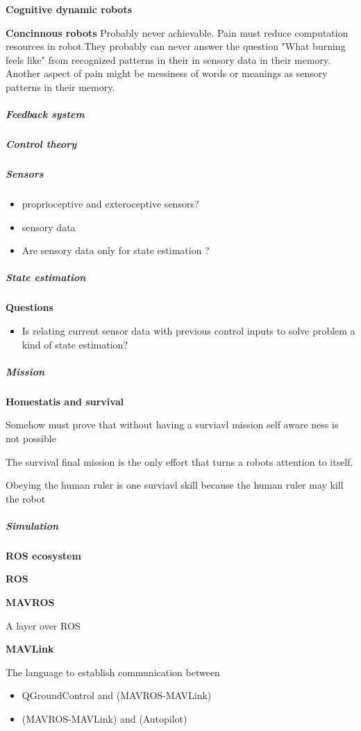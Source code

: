 \documentclass{book}
\providecommand{\ProjectDeepHeading}[2]{%
    \par\medskip\noindent\textbf{#2}\par\smallskip
}
\begin{document}
        \textbf{Cognitive dynamic robots}

        \textbf{Concinnous robots}
        Probably never achievable. Pain must reduce computation resources in robot.They probably can never answer the question "What burning feels like" from recognized patterns in their in sensory data in their memory. Another aspect of pain might be messiness of words or meanings as sensory patterns in their memory.

\subparagraph{Feedback system}

\subparagraph{Control theory}

\subparagraph{Sensors}
    \begin{itemize}
        \item proprioceptive and exteroceptive sensors?
        \item sensory data
        \item Are sensory data only for state estimation ?
    \end{itemize}

\subparagraph{State estimation}
    \ProjectDeepHeading{1}{Questions}
        \begin{itemize}
            \item Is relating current sensor data with previous control inputs to solve problem a kind of state estimation?
        \end{itemize}
    
\subparagraph{Mission}
    \ProjectDeepHeading{3}{Homestatis and survival}
        Somehow must prove that without having a surviavl mission self aware ness is not possible
        
        The survival final mission is the only effort that turns a robots attention to itself.
        
        Obeying the human ruler is one surviavl skill because the human ruler may kill the robot


        
\subparagraph{Simulation}
    \ProjectDeepHeading{1}{ROS ecosystem}
    
    
    \ProjectDeepHeading{1}{ROS}
    
    
    \ProjectDeepHeading{1}{MAVROS}
    A layer over ROS
    
    
    \ProjectDeepHeading{1}{MAVLink}
    The language to establish communication between
    \begin{itemize}
        \item QGroundControl and (MAVROS-MAVLink)
        \item (MAVROS-MAVLink) and (Autopilot)
    \end{itemize}
    
\end{document}
